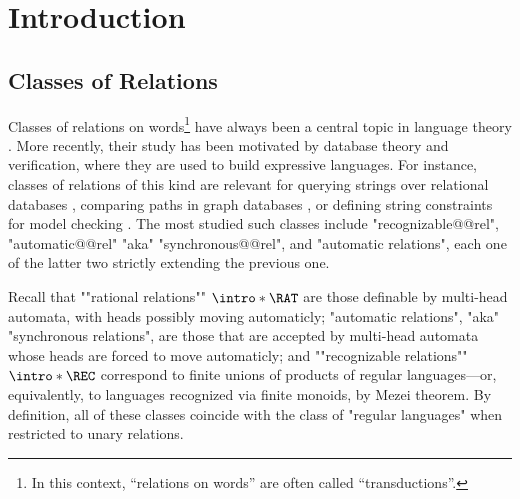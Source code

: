 \section{Introduction}
\label{sec:dichotomy-introduction}


\subsection{Classes of Relations}

Classes of relations on words\footnote{In this context, ``relations on words''
are often called ``transductions''.} have always been a central topic in language theory
\cite{ElgotMezi1965RelationsGeneralizedAutomata,Nivat1968TransductionChomsky,Berstel1979Transductions,FrougnySakarovitch1993SynchronizedRationalRelations,Choffrut2006Survey}. 
More recently, their study has been motivated by database theory and verification,
where they are used to build expressive languages. For instance, classes of relations of this kind are relevant for querying strings over relational 
databases \cite{BenediktLibkinSchwentickSegoufin2003DefinableRelations}, comparing paths in graph databases \cite{BarceloLibkinLinWood2012ExpressiveLanguages}, or defining  
string constraints for model checking \cite{LinBarcelo2016StringSolvingWordEquationsTransducers}. 
The most studied such classes include "recognizable@@rel", "automatic@@rel" "aka" "synchronous@@rel", and "automatic relations", each one of the latter two strictly extending the previous one. 

Recall that \AP""rational relations"" $\intro*\RAT$
are those definable by multi-head automata,
with heads possibly moving automaticly;
"automatic relations", "aka" "synchronous relations",
are those that are accepted by multi-head automata
whose heads are forced to move automaticly; and 
\AP""recognizable relations"" $\intro*\REC$ correspond to finite unions of products of regular languages---or, equivalently, to languages recognized via finite monoids, by Mezei theorem.
By definition, all of these classes coincide with the 
class of "regular languages" when restricted to unary relations.


